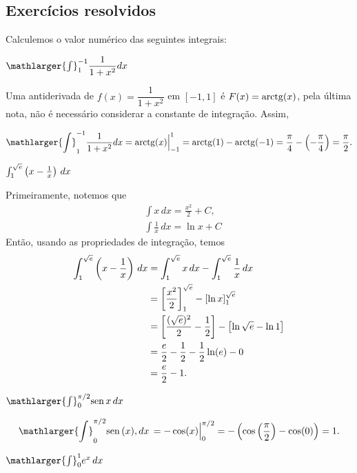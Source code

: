 \cleardoublepage\documentclass[../main.tex]{subfiles}
\begin{document}
\subsection{Exercícios resolvidos}
\begin{exeresol}
Calculemos o valor numérico das seguintes integrais:
  \begin{compactenum}[a)]
  \item \( \mathlarger{\int}^{-1}_{1}\dfrac{1}{1+x^2}dx\)
  
  \begin{solution}
  Uma antiderivada de \(f(x)=\dfrac{1}{1+x^2}\) em \([-1,1]\) é \(F(x)={\rm arctg}(x)\), pela última nota, não é necessário considerar a constante de integração. Assim,

\[ \mathlarger{\int}^{-1}_{1}\dfrac{1}{1+x^2}dx = {\rm arctg}(x) \Big{|}^{1}_{-1} = {\rm arctg}( 1)- {\rm arctg}(-1) = \dfrac{\pi}{4}-\left(-\dfrac{\pi}{4} \right)=\dfrac{\pi}{2}. \]
  \end{solution}
  \item $\int_1^{\sqrt{e}} \left(x - \frac{1}{x}\right)\,dx$
  
  \begin{resol}
  Primeiramente, notemos que
  \begin{align*}
    & \int x\,dx = \frac{x^2}{2} + C,\\
    & \int \frac{1}{x}\,dx = \ln x + C
  \end{align*}
  Então, usando as propriedades de integração, temos
  \begin{align*}
    \int_1^{\sqrt{e}} \left(x - \frac{1}{x}\right)\,dx &= \int_1^{\sqrt{e}} x\,dx - \int_1^{\sqrt{e}} \frac{1}{x}\,dx \\
                                 &= \left[\frac{x^2}{2}\right]_1^{\sqrt{e}} - \left[\ln x\right]_1^{\sqrt{e}} \\
                                          &= \left[\frac{(\sqrt{e})^2}{2} - \frac{1}{2}\right] - \left[\ln\sqrt{e} - \ln 1\right]\\
                                          &= \frac{e}{2} - \frac{1}{2} - \frac{1}{2}\ln(e) - 0 \\
                                          &= \frac{e}{2} - 1.
  \end{align*}
\end{resol}

  \item \( \mathlarger{\int}^{\pi/2}_{0}{\rm sen\,}x\,dx\)\\
  
  \begin{solution}
  \[ \mathlarger{\int}^{\pi/2}_{0}{\rm sen\,}(x),dx \,= - \cos(x)\Big{|}^{\pi/2}_{0} = -\left(\cos\left(\dfrac{\pi}{2}\right) - \cos(0) \right)=1. \]
  \end{solution}
  \item \(\mathlarger{\int}^{1}_{0} e^x\,dx\)\\
  

\end{compactenum}
\end{exeresol}
\end{document}
